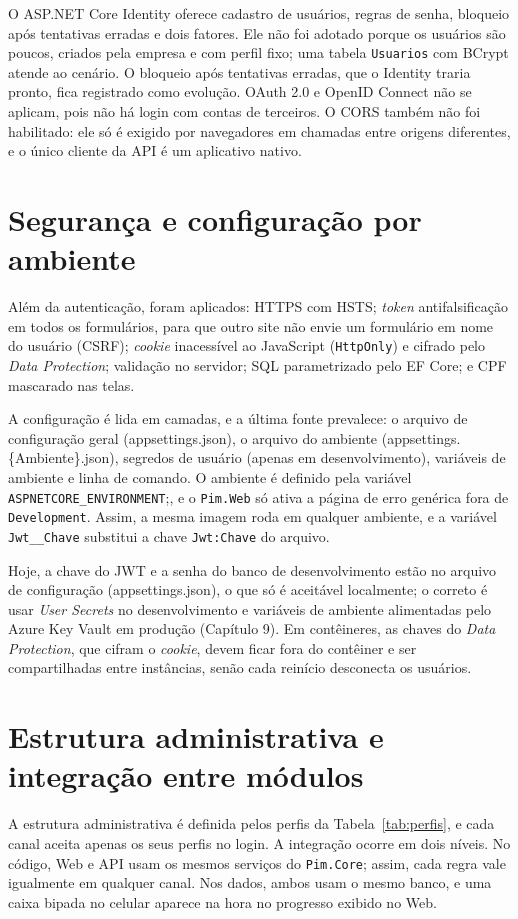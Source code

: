 O ASP.NET Core Identity oferece cadastro de usuários, regras de senha, bloqueio após tentativas erradas e dois fatores. Ele não foi adotado porque os usuários são poucos, criados pela empresa e com perfil fixo; uma tabela \texttt{Usuarios} com BCrypt atende ao cenário. O bloqueio após tentativas erradas, que o Identity traria pronto, fica registrado como evolução. OAuth 2.0 e OpenID Connect não se aplicam, pois não há login com contas de terceiros. O CORS também não foi habilitado: ele só é exigido por navegadores em chamadas entre origens diferentes, e o único cliente da API é um aplicativo nativo.

\section{Segurança e configuração por ambiente}
\label{sec:seguranca}

Além da autenticação, foram aplicados: HTTPS com HSTS; \textit{token} antifalsificação em todos os formulários, para que outro site não envie um formulário em nome do usuário (CSRF); \textit{cookie} inacessível ao JavaScript (\texttt{HttpOnly}) e cifrado pelo \textit{Data Protection}; validação no servidor; SQL parametrizado pelo EF Core; e CPF mascarado nas telas.

A configuração é lida em camadas, e a última fonte prevalece: o arquivo de configuração geral (appsettings.json), o arquivo do ambiente (appsettings.\allowbreak\{Ambiente\}.json), segredos de usuário (apenas em desenvolvimento), variáveis de ambiente e linha de comando. O ambiente é definido pela variável \texttt{ASPNETCORE\_\allowbreak ENVIRONMENT};, e o \texttt{Pim.Web} só ativa a página de erro genérica fora de \texttt{Development}. Assim, a mesma imagem roda em qualquer ambiente, e a variável \texttt{Jwt\_\_Chave} substitui a chave \texttt{Jwt:Chave} do arquivo.

Hoje, a chave do JWT e a senha do banco de desenvolvimento estão no arquivo de configuração (appsettings.json), o que só é aceitável localmente; o correto é usar \textit{User Secrets} no desenvolvimento e variáveis de ambiente alimentadas pelo Azure Key Vault em produção (Capítulo 9). Em contêineres, as chaves do \textit{Data Protection}, que cifram o \textit{cookie}, devem ficar fora do contêiner e ser compartilhadas entre instâncias, senão cada reinício desconecta os usuários.

\section{Estrutura administrativa e integração entre módulos}

A estrutura administrativa é definida pelos perfis da Tabela~\ref{tab:perfis}, e cada canal aceita apenas os seus perfis no login. 
A integração ocorre em dois níveis. No código, Web e API usam os mesmos serviços do \texttt{Pim.Core}; assim, cada regra vale igualmente em qualquer canal. Nos dados, ambos usam o mesmo banco, e uma caixa bipada no celular aparece na hora no progresso exibido no Web.
